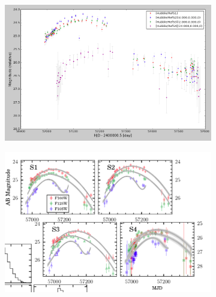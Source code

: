 \begin{figure}
\centering
\begin{subfigure}{.3\textwidth}
\centering
\includegraphics[width=\linewidth]{supcos_points.png}
        \caption{}\label{fig:fig_a}
\end{subfigure}
\begin{subfigure}{.3\textwidth}
\centering
\includegraphics[width=\linewidth]{rodney_fits.png}
\caption{}\label{fig:fig_b}
\end{subfigure}
\begin{subfigure}{.3\textwidth}
\centering
\vspace{0pt}

\end{subfigure}
\end{figure}

